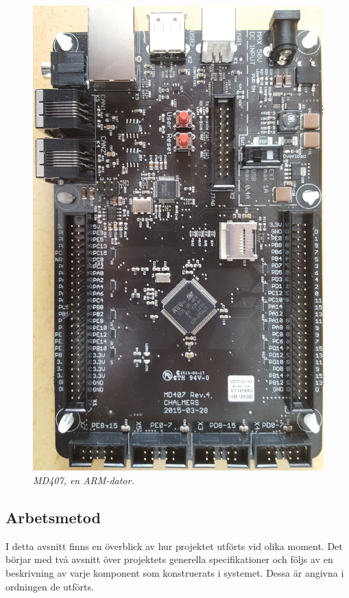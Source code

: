 \documentclass[a4paper]{article}
\begin{document}
\begin{figure}[H]
\includegraphics[scale=0.03]{MD407.jpg} \hspace{2mm}
\centering
\caption{\it MD407, en ARM-dator.}
\end{figure}

\subsection{Arbetsmetod}
I detta avsnitt finns en överblick av hur projektet utförts vid olika moment. Det börjar med två avsnitt över projektets generella specifikationer och följs av en beskrivning av varje komponent som konstruerats i systemet. Dessa är angivna i ordningen de utförts.
\end{document}
